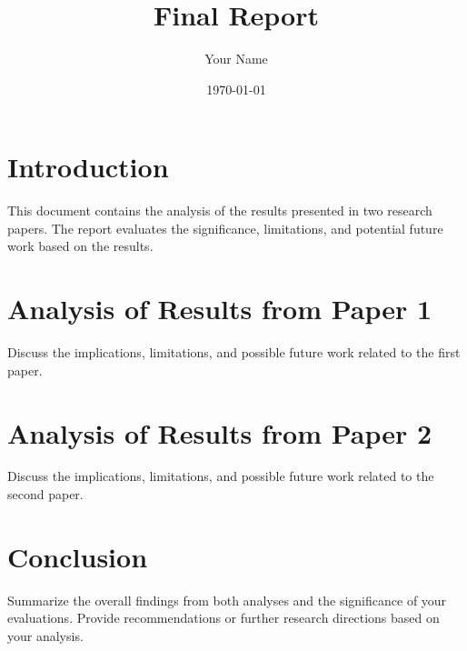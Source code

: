 \documentclass[a4paper, 12pt]{article}
\title{Final Report}
\author{Your Name}
\date{\today}
\begin{document}
\maketitle

\section*{Introduction}
This document contains the analysis of the results presented in two research papers. The report evaluates the significance, limitations, and potential future work based on the results.

\section{Analysis of Results from Paper 1}
Discuss the implications, limitations, and possible future work related to the first paper.

\section{Analysis of Results from Paper 2}
Discuss the implications, limitations, and possible future work related to the second paper.

\section*{Conclusion}
Summarize the overall findings from both analyses and the significance of your evaluations. Provide recommendations or further research directions based on your analysis.


\end{document}
